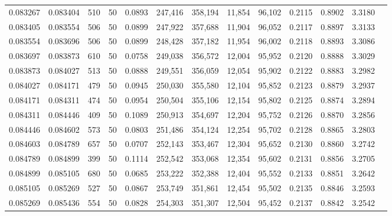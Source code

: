 \begin{tabular}{rrrrrrrrrrrrr}
0.083267 & 0.083404 &   510 &  50 &                                     0.0893 & 247,416 & 358,194 &  11,854 &  96,102 & 0.2115 & 0.8902 & 3.3180 \\
0.083405 & 0.083554 &   506 &  50 &                                     0.0899 & 247,922 & 357,688 &  11,904 &  96,052 & 0.2117 & 0.8897 & 3.3133 \\
0.083554 & 0.083696 &   506 &  50 &                                     0.0899 & 248,428 & 357,182 &  11,954 &  96,002 & 0.2118 & 0.8893 & 3.3086 \\
0.083697 & 0.083873 &   610 &  50 &                                     0.0758 & 249,038 & 356,572 &  12,004 &  95,952 & 0.2120 & 0.8888 & 3.3029 \\
0.083873 & 0.084027 &   513 &  50 &                                     0.0888 & 249,551 & 356,059 &  12,054 &  95,902 & 0.2122 & 0.8883 & 3.2982 \\
0.084027 & 0.084171 &   479 &  50 &                                     0.0945 & 250,030 & 355,580 &  12,104 &  95,852 & 0.2123 & 0.8879 & 3.2937 \\
0.084171 & 0.084311 &   474 &  50 &                                     0.0954 & 250,504 & 355,106 &  12,154 &  95,802 & 0.2125 & 0.8874 & 3.2894 \\
0.084311 & 0.084446 &   409 &  50 &                                     0.1089 & 250,913 & 354,697 &  12,204 &  95,752 & 0.2126 & 0.8870 & 3.2856 \\
0.084446 & 0.084602 &   573 &  50 &                                     0.0803 & 251,486 & 354,124 &  12,254 &  95,702 & 0.2128 & 0.8865 & 3.2803 \\
0.084603 & 0.084789 &   657 &  50 &                                     0.0707 & 252,143 & 353,467 &  12,304 &  95,652 & 0.2130 & 0.8860 & 3.2742 \\
0.084789 & 0.084899 &   399 &  50 &                                     0.1114 & 252,542 & 353,068 &  12,354 &  95,602 & 0.2131 & 0.8856 & 3.2705 \\
0.084899 & 0.085105 &   680 &  50 &                                     0.0685 & 253,222 & 352,388 &  12,404 &  95,552 & 0.2133 & 0.8851 & 3.2642 \\
0.085105 & 0.085269 &   527 &  50 &                                     0.0867 & 253,749 & 351,861 &  12,454 &  95,502 & 0.2135 & 0.8846 & 3.2593 \\
0.085269 & 0.085436 &   554 &  50 &                                     0.0828 & 254,303 & 351,307 &  12,504 &  95,452 & 0.2137 & 0.8842 & 3.2542 \\

\end{tabular}
